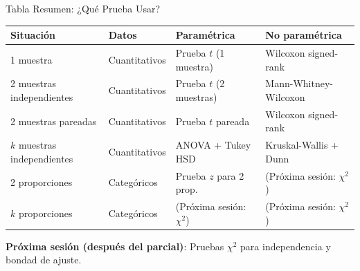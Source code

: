 \documentclass[aspectratio=169, 11pt]{beamer}
\begin{document}
\begin{frame}{Tabla Resumen: ¿Qué Prueba Usar?}
\begin{table}
\centering
\tiny
\begin{tabular}{p{2.5cm}p{2cm}p{2.5cm}p{2.5cm}}
\toprule
\textbf{Situación} & \textbf{Datos} & \textbf{Paramétrica} & \textbf{No paramétrica} \\
\midrule
1 muestra & Cuantitativos & Prueba $t$ (1 muestra) & Wilcoxon signed-rank \\[0.2cm]
2 muestras independientes & Cuantitativos & Prueba $t$ (2 muestras) & Mann-Whitney-Wilcoxon \\[0.2cm]
2 muestras pareadas & Cuantitativos & Prueba $t$ pareada & Wilcoxon signed-rank \\[0.2cm]
$k$ muestras independientes & Cuantitativos & ANOVA + Tukey HSD & Kruskal-Wallis + Dunn \\[0.2cm]
2 proporciones & Categóricos & Prueba $z$ para 2 prop. & (Próxima sesión: $\chi^2$) \\[0.2cm]
$k$ proporciones & Categóricos & (Próxima sesión: $\chi^2$) & (Próxima sesión: $\chi^2$) \\
\bottomrule
\end{tabular}
\end{table}

\vspace{0.3cm}
\small
\textbf{Próxima sesión (después del parcial)}: Pruebas $\chi^2$ para independencia y bondad de ajuste.
\end{frame}
\end{document}
